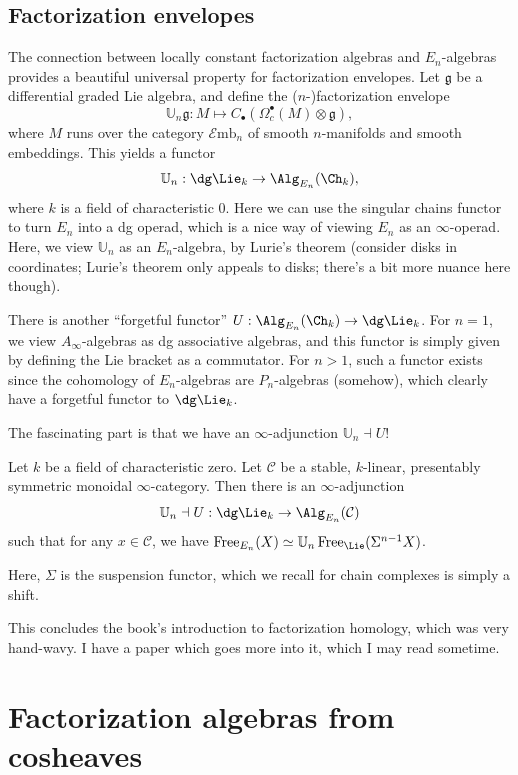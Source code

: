 \subsection{Factorization envelopes}

The connection between locally constant factorization algebras and $E_n$-algebras provides a beautiful universal property for factorization envelopes. Let $\mathfrak{g} $ be a differential graded Lie algebra, and define the ($n$-)factorization envelope
\[
	\mathbb{U} _n\mathfrak{g} : M\mapsto C_{\bullet} (\Omega ^{\bullet} _c(M)\otimes \mathfrak{g} ),
\]
where $M$ runs over the category $\mathcal{E} \mathrm{mb} _n$ of smooth $n$-manifolds and smooth embeddings. This yields a functor
\[
	\mathbb{U} _n : \dg\Lie_{k}  \to \Alg_{E_n}(\Ch_{k} )
,\]
where $k$ is a field of characteristic 0. Here we can use the singular chains functor to turn $E_n$ into a dg operad, which is a nice way of viewing $E_n$ as an $\infty $-operad. Here, we view $\mathbb{U} _n$ as an $E_n$-algebra, by Lurie's theorem (consider disks in coordinates; Lurie's theorem only appeals to disks; there's a bit more nuance here though).

There is another ``forgetful functor'' $U : \Alg_{E_n}(\Ch_{k} )  \to \dg\Lie_k$. For $n=1$, we view $A_\infty $-algebras as dg associative algebras, and this functor is simply given by defining the Lie bracket as a commutator. For $n>1$, such a functor exists since the cohomology of $E_n$-algebras are $P_n$-algebras (somehow), which clearly have a forgetful functor to $\dg\Lie_{k} $.

The fascinating part is that we have an $\infty $-adjunction $\mathbb{U} _n \dashv U$!
\begin{theorem}\label{thm:6-4-5}
	Let $k$ be a field of characteristic zero. Let $\mathcal{C} $ be a stable, $k$-linear, presentably symmetric monoidal $\infty $-category. Then there is an $\infty $-adjunction
	\[
		\mathbb{U} _n \dashv U : \dg\Lie_k \to \Alg_{E_n} (\mathcal{C} )
	\]
	such that for any $x\in \mathcal{C} $, we have $\operatorname{Free}_{E_n} (X)\simeq \mathbb{U} _n \operatorname{Free}_{\Lie} (\Sigma ^{n-1} X)$.
\end{theorem}
Here, $\Sigma $ is the suspension functor, which we recall for chain complexes is simply a shift.

This concludes the book's introduction to factorization homology, which was very hand-wavy. I have a paper which goes more into it, which I may read sometime.

\section{Factorization algebras from cosheaves}

